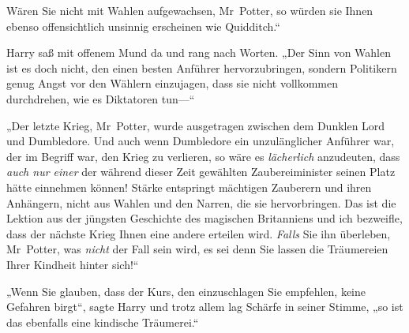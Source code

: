 Wären Sie nicht mit Wahlen aufgewachsen, Mr~Potter, so würden sie Ihnen ebenso offensichtlich unsinnig erscheinen wie Quidditch.“

Harry saß mit offenem Mund da und rang nach Worten.
„Der Sinn von Wahlen ist es doch nicht, den einen besten Anführer hervorzubringen, sondern Politikern genug Angst vor den Wählern einzujagen, dass sie nicht vollkommen durchdrehen, wie es Diktatoren tun—“

„Der letzte Krieg, Mr~Potter, wurde ausgetragen zwischen dem Dunklen Lord und Dumbledore. Und auch wenn Dumbledore ein unzulänglicher Anführer war, der im Begriff war, den Krieg zu verlieren, so wäre es \emph{lächerlich} anzudeuten, dass \emph{auch nur einer} der während dieser Zeit gewählten Zaubereiminister seinen Platz hätte einnehmen können! Stärke entspringt mächtigen Zauberern und ihren Anhängern, nicht aus Wahlen und den Narren, die sie hervorbringen. Das ist die Lektion aus der jüngsten Geschichte des magischen Britanniens und ich bezweifle, dass der nächste Krieg Ihnen eine andere erteilen wird. \emph{Falls} Sie ihn überleben, Mr~Potter, was \emph{nicht} der Fall sein wird, es sei denn Sie lassen die Träumereien Ihrer Kindheit hinter sich!“

„Wenn Sie glauben, dass der Kurs, den einzuschlagen Sie empfehlen, keine Gefahren birgt“, sagte Harry und trotz allem lag Schärfe in seiner Stimme, „so ist das ebenfalls eine kindische Träumerei.“

